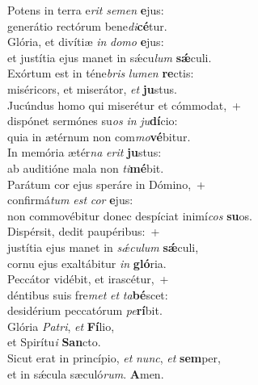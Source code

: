 \evenverse Potens in terra e\textit{rit} \textit{se}\textit{men} \textbf{e}jus:~\*\\
\evenverse generátio rectórum bene\textit{di}\textbf{cé}tur.\\
\oddverse Glória, et divítiæ \textit{in} \textit{do}\textit{mo} \textbf{e}jus:~\*\\
\oddverse et justítia ejus manet in sǽcu\textit{lum} \textbf{sǽ}culi.\\
\evenverse Exórtum est in téne\textit{bris} \textit{lu}\textit{men} \textbf{re}ctis:~\*\\
\evenverse miséricors, et miserátor, \textit{et} \textbf{ju}stus.\\
\oddverse Jucúndus homo qui miserétur et cómmodat,~+\\
\oddverse  dispónet sermónes su\textit{os} \textit{in} \textit{ju}\textbf{dí}cio:~\*\\
\oddverse quia in ætérnum non com\textit{mo}\textbf{vé}bitur.\\
\evenverse In memória ætér\textit{na} \textit{e}\textit{rit} \textbf{ju}stus:~\*\\
\evenverse ab auditióne mala non \textit{ti}\textbf{mé}bit.\\
\oddverse Parátum cor ejus speráre in Dómino,~+\\
\oddverse  confirmá\textit{tum} \textit{est} \textit{cor} \textbf{e}jus:~\*\\
\oddverse non commovébitur donec despíciat inimí\textit{cos} \textbf{su}os.\\
\evenverse Dispérsit, dedit paupéribus:~+\\
\evenverse  justítia ejus manet in \textit{sǽ}\textit{cu}\textit{lum} \textbf{sǽ}culi,~\*\\
\evenverse cornu ejus exaltábitur \textit{in} \textbf{gló}ria.\\
\oddverse Peccátor vidébit, et irascétur,~+\\
\oddverse  déntibus suis fre\textit{met} \textit{et} \textit{ta}\textbf{bé}scet:~\*\\
\oddverse desidérium peccatórum \textit{pe}\textbf{rí}bit.\\
\evenverse Glória \textit{Pa}\textit{tri}, \textit{et} \textbf{Fí}lio,~\*\\
\evenverse et Spirítu\textit{i} \textbf{San}cto.\\
\oddverse Sicut erat in princípio, \textit{et} \textit{nunc}, \textit{et} \textbf{sem}per,~\*\\
\oddverse et in sǽcula sæculó\textit{rum}. \textbf{A}men.\\
